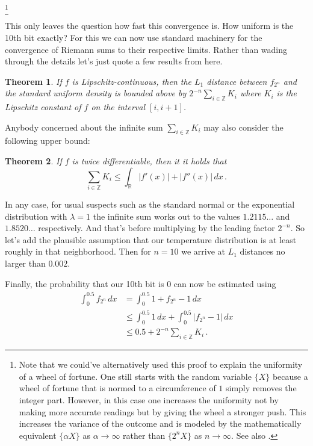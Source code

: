 \documentclass{article}
\theoremstyle{theorem}
\newtheorem{theorem}{Theorem}
\theoremstyle{definition}
\begin{document}
\let\thefootnote\relax\footnote{Note that we could've alternatively used this proof to explain the uniformity of a wheel of fortune. One still starts with the random variable $\{X\}$ because a wheel of fortune that is normed to a circumference of $1$ simply removes the integer part. However, in this case one increases the uniformity not by making more accurate readings but by giving the wheel a stronger push. This increases the variance of the outcome and is modeled by the mathematically equivalent $\{\alpha X\}$ as $\alpha\to\infty$ rather than $\{2^n X\}$ as $n\to\infty$. See also \cite{Zaman}.}
\addtocounter{footnote}{-1}\let\thefootnote\svthefootnote
This only leaves the question how fast this convergence is. How uniform is the 10th bit exactly? For this we can now use standard machinery for the convergence of Riemann sums to their respective limits. Rather than wading through the details let's just quote a few results from \cite{Me} here.

\begin{theorem}
If $f$ is Lipschitz-continuous, then the $L_1$ distance between $f_{2^n}$ and the standard uniform density is bounded above by $2^{-n}\sum_{i\in\mathbb{Z}}K_i$ where $K_i$ is the Lipschitz constant of $f$ on the interval $[i,i+1]$.
\end{theorem}

Anybody concerned about the infinite sum $\sum_{i\in\mathbb{Z}}K_i$ may also consider the following upper bound:

\begin{theorem}
If $f$ is twice differentiable, then it it holds that
\[
\sum_{i\in\mathbb{Z}}K_i \leq \int_\mathbb{R} |f'(x)|+|f''(x)|\,dx\,.
\]
\end{theorem}

In any case, for usual suspects such as the standard normal or the exponential distribution with $\lambda=1$ the infinite sum works out to the values $1.2115\dots$ and $1.8520\dots$ respectively. And that's before multiplying by the leading factor $2^{-n}$. So let's add the plausible assumption that our temperature distribution is at least roughly in that neighborhood. Then for $n=10$ we arrive at $L_1$ distances no larger than $0.002$.

Finally, the probability that our 10th bit is $0$ can now be estimated using
\[
\begin{split}
\int_0^{0.5} f_{2^n}\,dx
& = \int_0^{0.5} 1 + f_{2^n} - 1\,dx\\
& \leq \int_0^{0.5}1\,dx + \int_0^{0.5} |f_{2^n}-1|\,dx\\
& \leq 0.5+2^{-n}\sum_{i\in\mathbb{Z}}K_i\,.
\end{split}
\]
\end{document}
